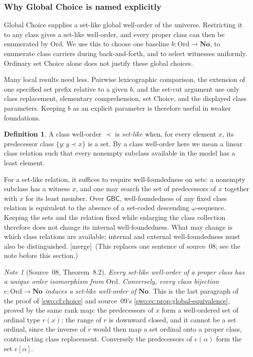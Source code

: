 \documentclass[11pt]{article}
\theoremstyle{definition}
\newtheorem{definition}[definition]{Definition}
\theoremstyle{remark}
\newtheorem{note}[note]{Note}
\newcommand{\No}{\mathbf{No}}
\newcommand{\Ord}{\mathrm{Ord}}
\newcommand{\GBC}{\mathsf{GBC}}
\newcommand{\merge}{\textsf{[merge]}}
\begin{document}
\subsubsection{Why Global Choice is named explicitly}

Global Choice supplies a set-like global well-order of the universe.
Restricting it to any class gives a set-like well-order, and every
proper class can then be enumerated by $\Ord$. We use this to choose
one baseline $b:\Ord\to\No$, to enumerate class carriers during
back-and-forth, and to select witnesses uniformly. Ordinary set Choice
alone does not justify these global choices.

Many local results need less. Pairwise lexicographic comparison, the
extension of one specified set prefix relative to a given $b$, and the
set-cut argument use only class replacement, elementary comprehension,
set Choice, and the displayed class parameters. Keeping $b$ as an
explicit parameter is therefore useful in weaker foundations.

\begin{definition}\label{swo:sk:n8.1}
A class well-order $\prec$ is \emph{set-like} when, for every element
$x$, its predecessor class $\{y:y\prec x\}$ is a set. By a class
well-order here we mean a linear class relation such that every
nonempty subclass available in the model has a least element.
\end{definition}

For a set-like relation, it suffices to require well-foundedness on
sets: a nonempty subclass has a witness $x$, and one may search the
set of predecessors of $x$ together with $x$ for its least member.
Over $\GBC$, well-foundedness of any fixed class relation is equivalent
to the absence of a set-coded descending $\omega$-sequence. Keeping the
sets and the relation fixed while enlarging the class collection therefore
does not change its internal well-foundedness. What may change is which
class relations are available; internal and external well-foundedness
must also be distinguished.
\merge\ (This replaces one sentence of source~08; see the note before
this section.)



\begin{note}[Source~08, Theorem~8.2]\label{swo:sk:thm:enumclass}
\emph{Every set-like well-order of a proper class has a unique order
isomorphism from $\Ord$. Conversely, every class bijection $e:\Ord\to\No$
induces a set-like well-order of $\No$.} This is the last paragraph of the
proof of \cref{swo:cf:choice} and source~09's
\cref{swo:ec:prop:global-equivalence}, proved by the same rank map: the
predecessors of $x$ form a well-ordered set of ordinal type $r(x)$; the range
of $r$ is downward closed, and it cannot be a set ordinal, since the inverse
of $r$ would then map a set ordinal onto a proper class, contradicting class
replacement. Conversely the predecessors of $e(\alpha)$ form the set
$e[\alpha]$.
\end{note}
\end{document}
